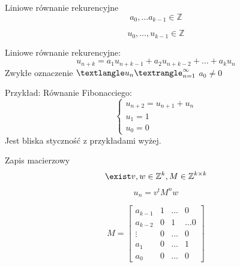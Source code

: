 \documentclass[handout]{beamer}
\theoremstyle{definition}
\theoremstyle{named}
\begin{document}
\begin{frame}{Liniowe równanie rekurencyjne}
    $$
        a_0, \ldots a_{k-1} \in \mathbb{Z} 
    $$

    $$
        u_0, \ldots, u_{k-1} \in \mathbb{Z}
    $$


    Liniowe równanie rekurencyjne: 
    $$
    u_{n+k}=a_{1} u_{n+k-1}+a_{2} u_{n+k-2}+\ldots+a_{k} u_{n}
    $$
    Zwykłe oznaczenie $\textlangle u_n \textrangle _{n=1}^{\infty}$
    $a_0 \neq 0$
\end{frame}




\begin{frame}
    Przykład:
    Równanie Fibonacciego:
   \begin{equation*}
        \begin{cases}
        u_{n+2} = u_{n+1} + u_n \\
        u_{1} = 1 \\
        u_{0} = 0
        \end{cases}
    \end{equation*}
    Jest bliska styczność z przykładami wyżej. 

\end{frame}

\begin{frame}{Zapis macierzowy}
    $$\exist v, w \in \mathbb{Z}^{k}, M \in \mathbb{Z}^{k\times k} $$
    $$u_n = v^{t}M^{n}w$$

    $$
    M = \begin{bmatrix}
    a_{k-1} & 1 &  \ldots & 0 \\
    a_{k-2} & 0 & 1 & \ldots 0  \\
    \vdots & 0 & \ldots & 0 \\ 
    a_1 & 0 & \ldots & 1 \\
    a_0 & 0 & \ldots & 0
    \end{bmatrix}
    $$
\end{frame}
\end{document}
